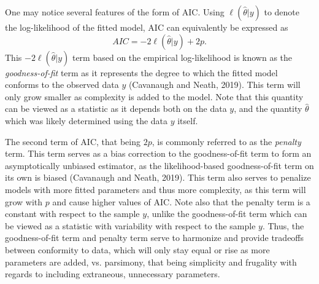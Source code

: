 		One may notice several features of the form of AIC. Using $\ell(\hat{\theta}|y)$ to denote the log-likelihood of the fitted model, AIC can equivalently be expressed as
		\begin{equation}
			AIC = -2 \ell(\hat{\theta}|y) + 2 p.
		\end{equation}
		This $-2 \ell(\hat{\theta}|y)$ term based on the empirical log-likelihood is known as the \textit{goodness-of-fit} term as it represents the degree to which the fitted model
		conforms to the observed data $y$ (Cavanaugh and Neath, 2019). This term will only grow smaller as complexity is added to the model. Note that this quantity can be viewed as
		a statistic as it depends both on the data $y$, and the quantity $\hat{\theta}$ which was likely determined using the data $y$ itself.

		The second term of AIC, that being $2 p$, is commonly referred to as the \textit{penalty} term. This term serves as a bias correction to the goodness-of-fit term to form an asymptotically
		unbiased estimator, as the likelihood-based goodness-of-fit term on its own is biased (Cavanaugh and Neath, 2019). This term also serves to penalize models with more fitted parameters and
		thus more complexity, as this term will grow with $p$ and cause higher values of AIC. Note also that the penalty term is a constant with respect to the sample $y$, unlike the goodness-of-fit
		term which can be viewed as a statistic with variability with respect to the sample $y$. Thus, the goodness-of-fit term and penalty term serve to harmonize and provide tradeoffs between
		conformity to data, which will only stay equal or rise as more parameters are added, vs. parsimony, that being simplicity and frugality with regards to including extraneous, unnecessary
		parameters.

